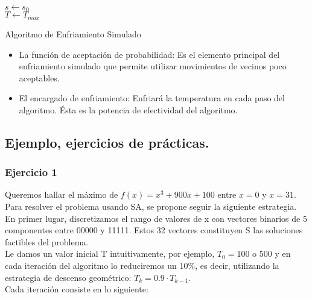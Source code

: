\documentclass{llncs}
\begin{document}
\begin{algorithm}[H]
	$s \gets s_0$\\
    $T \gets T_{max}$\\
    \caption{Algoritmo de Enfriamiento Simulado}
     
\end{algorithm}	
\begin{itemize}
\item La funci\'{o}n de aceptaci\'{o}n de probabilidad: Es el elemento principal del enfriamiento simulado que permite utilizar movimientos de vecinos poco aceptables.
\item El encargado de enfriamiento: Enfriar\'{a} la temperatura en cada paso del algoritmo. \'{E}sta es la potencia de efectividad del algoritmo.
\end{itemize}

\subsection*{Ejemplo, ejercicios de pr\'{a}cticas.}
\subsubsection*{Ejercicio 1}

Queremos hallar el m\'{a}ximo de $f(x) = x^3 + 900x + 100$ entre $x=0$ y $x = 31$. Para resolver el problema usando  SA, se propone seguir la siguiente estrategia. En primer lugar, discretizamos el rango de valores de x con vectores binarios de 5 componentes entre 00000 y 11111. Estos 32 vectores constituyen S las soluciones factibles del problema.\\

Le damos un valor inicial T intuitivamente, por ejemplo, $T_0=100$ o 500 y en cada iteraci\'{o}n del algoritmo lo reduciremos un 10\%, es decir, utilizando la estrategia de descenso geom\'{e}trico: $T_k = 0.9 \cdot T_{k-1}$.\\

Cada iteraci\'{o}n consiste en lo siguiente:\\
\end{document}
